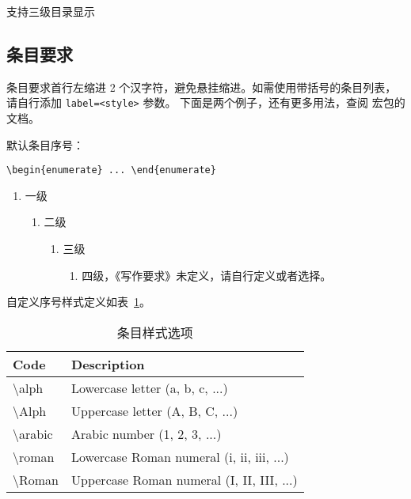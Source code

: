 支持三级目录显示


\subsection{条目要求}

条目要求首行左缩进 2 个汉字符，避免悬挂缩进。如需使用带括号的条目列表，请自行添加 \verb|label=<style>| 参数。
下面是两个例子，还有更多用法，查阅  宏包的文档。

默认条目序号：

\verb|\begin{enumerate} ... \end{enumerate}|

\begin{enumerate}
  \item 一级
  \begin{enumerate}
    \item 二级
    \begin{enumerate}
      \item 三级
      \begin{enumerate}
        \item 四级，《写作要求》未定义，请自行定义或者选择。
      \end{enumerate}
    \end{enumerate}
  \end{enumerate}
\end{enumerate}

自定义序号样式定义如表~\ref{tab:enum-style}。

\begin{table}[h]
  \centering
  \caption{条目样式选项}
  \label{tab:enum-style}
  \begin{tabular}{@{}ll@{}}
  \toprule
  \textbf{Code}          & \textbf{Description}                      \\ \midrule
  \textbackslash{}alph   & Lowercase letter (a, b, c, ...)           \\
  \textbackslash{}Alph   & Uppercase letter (A, B, C, ...)           \\
  \textbackslash{}arabic & Arabic number (1, 2, 3, ...)              \\
  \textbackslash{}roman  & Lowercase Roman numeral (i, ii, iii, ...) \\
  \textbackslash{}Roman  & Uppercase Roman numeral (I, II, III, ...) \\ \bottomrule
  \end{tabular}
\end{table}

